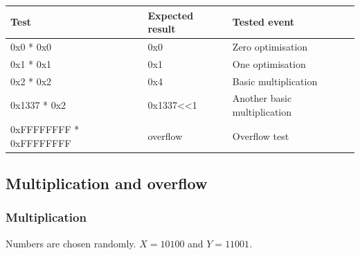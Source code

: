 \documentclass[a4paper]{report}
\begin{document}
\begin{center}
	\begin{tabular}{|l|l|l|}
		\hline
		Test & Expected result & Tested event \\
		\hline \hline
		0x0 * 0x0 & 0x0 & Zero optimisation \\
		0x1 * 0x1 & 0x1 & One optimisation \\
		0x2 * 0x2 & 0x4 & Basic multiplication \\
		0x1337 * 0x2 & 0x1337<<1 & Another basic multiplication \\
		0xFFFFFFFF * 0xFFFFFFFF & overflow & Overflow test \\
		\hline
	\end{tabular}
\end{center}

\subsection{Multiplication and overflow}

\subsubsection{Multiplication}

Numbers are chosen randomly. $X=10100$ and $Y=11001$.
\end{document}
